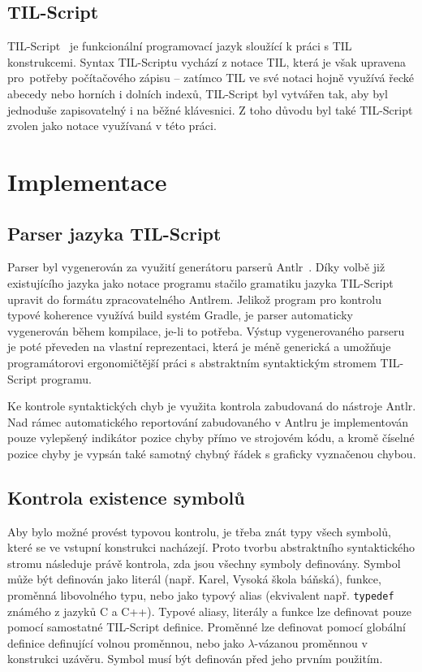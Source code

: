 \documentclass{article}
\begin{document}
\subsection{TIL-Script}

TIL-Script~\cite{til-script} je funkcionální programovací jazyk sloužící k práci s TIL konstrukcemi.
Syntax TIL-Scriptu vychází z notace TIL, která je však upravena pro~potřeby počítačového zápisu -- zatímco
TIL ve své notaci hojně využívá řecké abecedy nebo horních i dolních indexů, TIL-Script byl vytvářen
tak, aby byl jednoduše zapisovatelný i na běžné klávesnici. Z toho důvodu byl také TIL-Script zvolen
jako notace využívaná v této práci.

\section{Implementace}

\subsection{Parser jazyka TIL-Script}

Parser byl vygenerován za využití generátoru parserů Antlr~\cite{antlr-src}. Díky volbě již existujícího
jazyka jako notace programu stačilo gramatiku jazyka TIL-Script upravit do formátu zpracovatelného
Antlrem. Jelikož program pro kontrolu typové koherence využívá build systém Gradle, je parser automaticky
vygenerován během kompilace, je-li to potřeba. Výstup vygenerovaného parseru je poté převeden na vlastní
reprezentaci, která je méně generická a umožňuje programátorovi ergonomičtější práci s abstraktním
syntaktickým stromem TIL-Script programu.

Ke kontrole syntaktických chyb je využita kontrola zabudovaná do nástroje Antlr. Nad rámec automatického
reportování zabudovaného v Antlru je implementován pouze vylepšený indikátor pozice chyby přímo
ve strojovém kódu, a kromě číselné pozice chyby je vypsán také samotný chybný řádek s graficky vyznačenou
chybou.

\subsection{Kontrola existence symbolů}

Aby bylo možné provést typovou kontrolu, je třeba znát typy všech symbolů, které se ve vstupní konstrukci
nacházejí. Proto tvorbu abstraktního syntaktického stromu následuje právě kontrola, zda jsou všechny
symboly definovány. Symbol může být definován jako literál (např. Karel, Vysoká škola báňská), funkce,
proměnná libovolného typu, nebo jako typový alias (ekvivalent např. \texttt{typedef} známého z jazyků
C a C++). Typové aliasy, literály a funkce lze definovat pouze pomocí samostatné TIL-Script definice.
Proměnné lze definovat pomocí globální definice definující volnou proměnnou, nebo jako $\lambda$-vázanou
proměnnou v konstrukci uzávěru. Symbol musí být definován před jeho prvním použitím.
\end{document}
